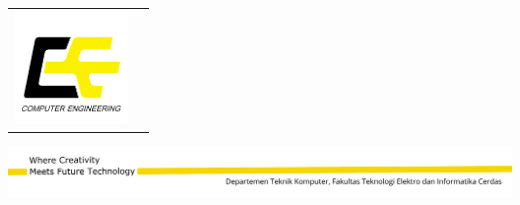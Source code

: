 
\def\headingtype{\bf \small}
\begin{titlepage}
	\centering
	\begin{tabularx}{\textwidth}{Xr}
		\multirow[c]{6}{*}{\includegraphics[width=3cm]{img/logodepart.png}}	 & {\emph{\headingtype \autor}} \\ [-2pt]
		&	{\headingtype \lab} \\[-2pt]
		&	{\headingtype \departemen} \\[-2pt]
		&	{\headingtype \emph{\institut}} \\[-2pt]	
		\vspace{1.6cm}
	\end{tabularx}\par
	\vspace{5.0cm}
	{\Huge \bf  \praktikum \par}
	\vspace{2.0cm}
	{\LARGE \bf \judul \par}
	\vspace{2.0cm}
	{\Large \tahun \par}
	\vfill
	{\centering
		\includegraphics[width=\textwidth]{img/footer.png}
	}
\end{titlepage}
